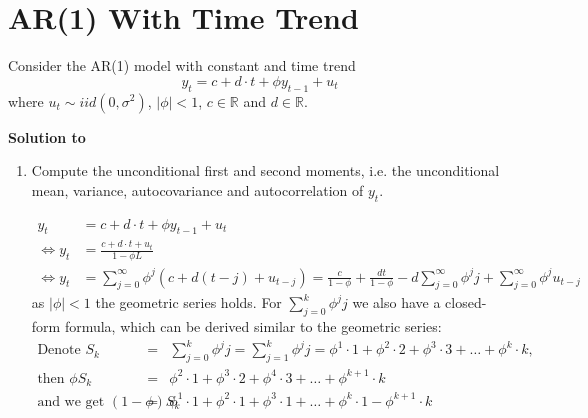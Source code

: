 \documentclass[a4paper]{scrartcl}
\begin{document}
    \section[AR(1) With Time Trend]{AR(1) With Time Trend}\label{ex:AR1timetrend}
    Consider the AR(1) model with constant and time trend
    $$ y_t = c + d\cdot t + \phi y_{t-1} + u_t$$
    where $u_t \sim iid(0,\sigma^2)$, $|\phi|<1$, $c \in \mathbb{R}$ and $d \in \mathbb{R}$.
    \begin{solution}\textbf{Solution to }\end{solution}
    \begin{enumerate}
        \item Compute the unconditional first and second moments, i.e. the unconditional mean, variance, autocovariance and autocorrelation of $y_t$.
              \begin{solution}		
                  \begin{align*}
                      y_t                 & = c + d\cdot t + \phi y_{t-1} + u_t                                                                                                                     \\
                      \Leftrightarrow y_t & = \frac{c + d\cdot t + u_t}{1-\phi L}                                                                                                                   \\
                      \Leftrightarrow y_t & = \sum_{j=0}^{\infty}\phi^j(c+d(t-j)+u_{t-j}) = \frac{c}{1-\phi} + \frac{dt}{1-\phi} - d\sum_{j=0}^{\infty}\phi^j j + \sum_{j=0}^{\infty}\phi^j u_{t-j}
                  \end{align*}
                  as $|\phi| <1$ the geometric series holds. For $\sum_{j=0}^{k} \phi^j j$ we also have a closed-form formula, which can be derived similar to the geometric series:
                  \begin{eqnarray*}
                      \text{Denote } S_{k}
                      &=&	\sum_{j=0}^{k} \phi^j j = \sum_{j=1}^{k} \phi^j j
                      =	\phi^1 \cdot 1 + \phi^2 \cdot 2+ \phi^3 \cdot 3 + \dots +  	
                      \phi^k \cdot k, \\
                      \text{then } \phi S_{k}
                      &=& \phi^2 \cdot 1 + \phi^3 \cdot 2+ \phi^4 \cdot 3 + \dots +  	
                      \phi^{k+1} \cdot k \\
                      \text{and we get } (1 - \phi) S_{k}
                      &=& \phi^1 \cdot 1+ \phi^2 \cdot 1 + \phi^3 \cdot 1 + \dots + \phi^{k} \cdot 1 - \phi^{k+1} \cdot k \\

\end{eqnarray*}
\end{solution}
\end{enumerate}
\end{document}
